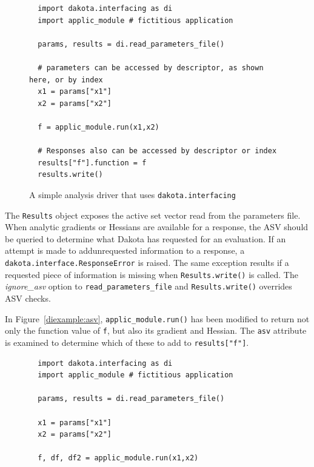 {\begin{figure}
\begin{bigbox}
\begin{small}
\begin{verbatim}
  import dakota.interfacing as di
  import applic_module # fictitious application 

  params, results = di.read_parameters_file()

  # parameters can be accessed by descriptor, as shown here, or by index
  x1 = params["x1"]
  x2 = params["x2"]

  f = applic_module.run(x1,x2)

  # Responses also can be accessed by descriptor or index
  results["f"].function = f
  results.write()
\end{verbatim}
\end{small}
\end{bigbox}
\caption{A simple analysis driver that uses {\tt dakota.interfacing}}
\label{diexample:simple}
\end{figure}

The {\tt Results} object exposes the active set vector read from the parameters file. When analytic gradients or Hessians are available for a response, the ASV should be queried to determine what Dakota has requested for an evaluation. If an attempt is made to addunrequested information to a response, a {\tt dakota.interface.ResponseError} is raised. The same exception results if a requested piece of information is missing when {\tt Results.write()} is called. The \emph{ignore\_asv} option to {\tt read\_parameters\_file} and {\tt Results.write()} overrides ASV checks.

In Figure~\ref{diexample:asv}, {\tt applic\_module.run()} has been modified to return not only the function value of {\tt f}, but also its gradient and Hessian. The {\tt asv} attribute is examined to determine which of these to add to {\tt results["f"]}.

\begin{figure}
\begin{bigbox}
\begin{small}
\begin{verbatim}
  import dakota.interfacing as di
  import applic_module # fictitious application

  params, results = di.read_parameters_file()

  x1 = params["x1"]
  x2 = params["x2"]

  f, df, df2 = applic_module.run(x1,x2)


\end{verbatim}
\end{small}
\end{bigbox}
\end{figure}}
